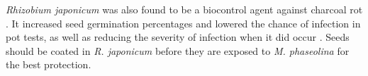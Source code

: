 \documentclass[12pt]{article}
\begin{document}
\emph{Rhizobium japonicum} was also found to be a biocontrol agent against charcoal rot \autocite{al2012rhizobium}. It increased seed germination percentages and lowered the chance of infection in pot tests, as well as reducing the severity of infection when it did occur \autocite{al2012rhizobium}. Seeds should be coated in \emph{R. japonicum} before they are exposed to \emph{M. phaseolina} for the best protection.


\newpage

\printbibliography
\end{document}

